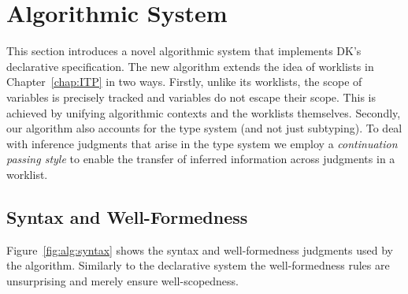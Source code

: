 \section{Algorithmic System}

This section introduces a novel algorithmic system that implements 
DK's declarative specification. The new algorithm extends the idea
of worklists in Chapter~\ref{chap:ITP} in two ways. Firstly,
unlike its worklists, the scope of variables is precisely tracked
and variables do not escape their scope. This is achieved by unifying algorithmic contexts and the worklists themselves.
Secondly, our algorithm also
accounts for the type system (and not just subtyping). To deal with
inference judgments that arise in the type system we employ a \emph{continuation
passing style} to enable the transfer of inferred information across
judgments in a worklist.

\subsection{Syntax and Well-Formedness}

Figure~\ref{fig:alg:syntax} shows the syntax and well-formedness
judgments used by the algorithm. Similarly to the declarative system 
the well-formedness rules are unsurprising and merely ensure 
well-scopedness.

